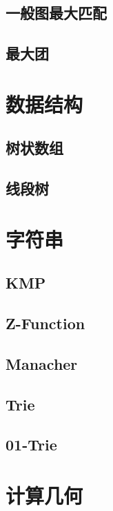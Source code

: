 \documentclass{article}
\begin{document}
\subsection{一般图最大匹配}

\subsection{最大团}


\section{数据结构}
\subsection{树状数组}

\subsection{线段树}
\section{字符串}
\subsection{KMP}

\subsection{Z-Function}

\subsection{Manacher}

\subsection{Trie}

\subsection{01-Trie}


\section{计算几何}

\end{document}
